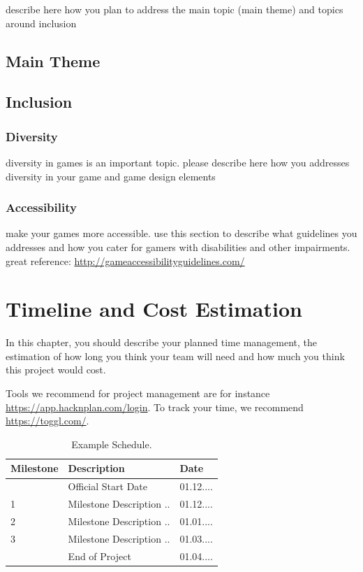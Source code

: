 \documentclass[a4paper]{scrreprt}
\begin{document}
describe here how you plan to address the main topic (main theme) and topics around inclusion

\section{Main Theme}
\section{Inclusion}

\subsection{Diversity}
diversity in games is an important topic. please describe here how you addresses diversity in your game and game design elements 
\subsection{Accessibility}
make your games more accessible. use this section to describe what guidelines you addresses and how you cater for  gamers with disabilities and other impairments. great reference: \url{http://gameaccessibilityguidelines.com/}



\chapter{Timeline and Cost Estimation}

In this chapter, you should describe your planned time management, the estimation of how long you think your team will need and how much you think this project would cost. 

Tools we recommend for project management are for instance \url{https://app.hacknplan.com/login}. To track your time, we recommend \url{https://toggl.com/}.  

\begin{table}[h]
\centering
\begin{tabular}{|l|l|l|}
\hline
Milestone & Description & Date \\\hline
& Official Start Date & 01.12.... \\
1 & Milestone Description ..  & 01.12.... \\
2 & Milestone Description ..  & 01.01.... \\
3 & Milestone Description ..  & 01.03.... \\
& End of Project & 01.04.... \\
\hline
\end{tabular}
\caption{\label{tab:schedule}Example Schedule.}
\end{table}
\end{document}
